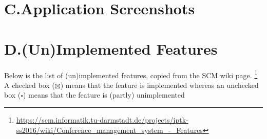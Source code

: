 \documentclass[nochapterpage,nopartpage,noheadingspace,numbersubsubsec,bigchapter,colorback,accentcolor=tud9c,10pt]{tudreport}
\begin{document}

  \chapter*{C.\quad Application Screenshots}


  \chapter*{D.\quad (Un)Implemented Features}

    Below is the list of (un)implemented features, copied from the SCM wiki page.%
    \footnote{\url{https://scm.informatik.tu-darmstadt.de/projects/iptk-ss2016/wiki/Conference_management_system_-_Features}}
    A checked box ($\boxtimes$) means that the feature is implemented whereas an unchecked box ($\square$) means that the feature is (partly) unimplemented
\end{document}
